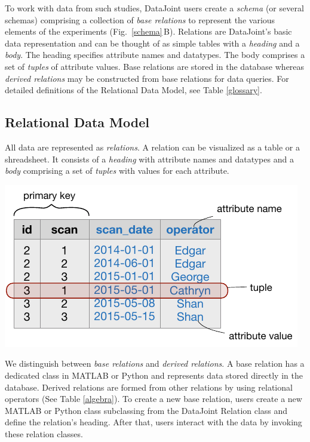 \documentclass[10pt,letterpaper]{article}
\begin{document}
To work with data from such studies, DataJoint users create a \emph{schema} (or several schemas) comprising a collection of \emph{base relations} to represent the various elements of the experiments (Fig.\ \ref{schema}\,B).
Relations are DataJoint's basic data representation and can be thought of as simple tables with a \emph{heading} and a \emph{body}.
The heading specifies attribute names and datatypes. 
The body comprises a set of \emph{tuples} of attribute values. 
Base relations are stored in the database whereas \emph{derived relations} may be constructed from base relations for data queries.
For detailed definitions of the Relational Data Model, see Table \ref{glossary}.

\begin{table}
\begin{boxedminipage}{\textwidth}
\section*{Relational Data Model}
\begin{description}
\setlength\itemsep{6pt}
\item[Relation] 
All data are represented as \emph{relations}.  A relation can be visualized as a table or a shreadsheet.  
It consists of a \emph{heading} with attribute names and datatypes and a \emph{body} comprising a set of \emph{tuples} with values for each attribute.

\begin{center}
\includegraphics{./figures/relation.pdf}
\end{center}

We distinguish between \emph{base relations} and \emph{derived relations}.  
A base relation has a dedicated class in MATLAB or Python and represents data stored directly in the database.
Derived relations are formed from other relations by using relational operators (See Table \ref{algebra}).
To create a new base relation, users create a new MATLAB or Python class subclassing from the DataJoint Relation class and define the relation's heading. 
After that, users interact with the data by invoking these relation classes.


\end{description}
\end{boxedminipage}
\end{table}
\end{document}
